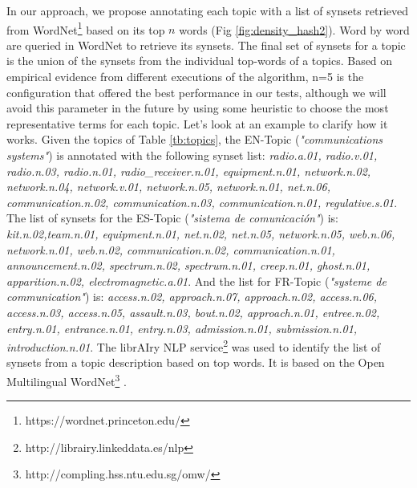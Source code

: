 In our approach, we propose annotating each topic with a list of synsets \citep{Bond2013} retrieved from WordNet\footnote{https://wordnet.princeton.edu/}\citep{Miller1995WordNet:English} based on its top $n$ words (Fig \ref{fig:density_hash2}). Word by word are queried in WordNet to retrieve its synsets. The final set of synsets for a topic is the union of the synsets from the individual top-words of a topics. Based on empirical evidence from different executions of the algorithm, n=5 is the configuration that offered the best performance in our tests, although we will avoid this parameter in the future by using some heuristic to choose the most representative terms for each topic. Let's look at an example to clarify how it works. Given the topics of Table \ref{tb:topics}, the EN-Topic (\textit{"communications systems"}) is annotated with the following synset list: \textit{radio.a.01, radio.v.01, radio.n.03, radio.n.01, radio\_receiver.n.01, equipment.n.01, network.n.02, network.n.04, network.v.01, network.n.05, network.n.01, net.n.06, communication.n.02, communication.n.03, communication.n.01, regulative.s.01}. The list of synsets for the ES-Topic (\textit{"sistema de comunicaci\'on"}) is:  \textit{kit.n.02,team.n.01, equipment.n.01, net.n.02, net.n.05, network.n.05, web.n.06, network.n.01, web.n.02, communication.n.02, communication.n.01, announcement.n.02, spectrum.n.02, spectrum.n.01, creep.n.01, ghost.n.01, apparition.n.02, electromagnetic.a.01}. And the list for FR-Topic (\textit{"systeme de communication"}) is:  \textit{access.n.02, approach.n.07, approach.n.02, access.n.06, access.n.03, access.n.05, assault.n.03, bout.n.02, approach.n.01, entree.n.02, entry.n.01, entrance.n.01, entry.n.03, admission.n.01, submission.n.01, introduction.n.01}. The librAIry NLP service\footnote{http://librairy.linkeddata.es/nlp} was used to identify the list of synsets from a topic description based on top words. It is based on the Open Multilingual WordNet\footnote{http://compling.hss.ntu.edu.sg/omw/} \citep{Bond2012}.

